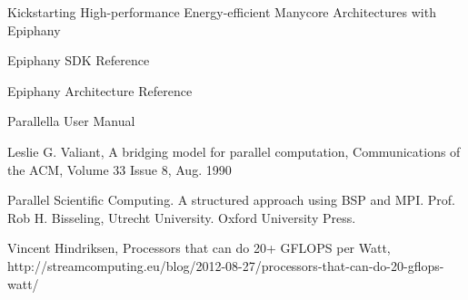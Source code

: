 \documentclass[fleqn]{article}
\renewcommand{\(}{\left(}
\renewcommand{\)}{\right)}
\begin{document}
\begin{thebibliography}{9}

  Kickstarting High-performance Energy-efficient Manycore Architectures with Epiphany

  Epiphany SDK Reference

  Epiphany Architecture Reference

  Parallella User Manual

    Leslie G. Valiant, A bridging model for parallel computation, Communications of the ACM, Volume 33 Issue 8, Aug. 1990

    Parallel Scientific Computing. A structured approach using BSP and MPI. Prof. Rob H. Bisseling, Utrecht University. Oxford University Press.

    Vincent Hindriksen, Processors that can do 20+ GFLOPS per Watt, http://streamcomputing.eu/blog/2012-08-27/processors-that-can-do-20-gflops-watt/


\end{thebibliography}
\end{document}
